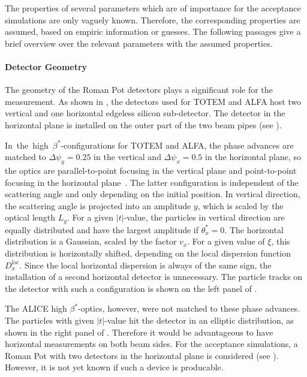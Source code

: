 The properties of several parameters which are of importance for the acceptance simulations are only vaguely known. Therefore, the corresponding properties are assumed, based on empiric information or guesses. The following passages give a brief overview over the relevant parameters with the assumed properties.


\paragraph{Detector Geometry}
The geometry of the Roman Pot detectors plays a significant role for the measurement. As shown in , the detectors used for TOTEM and ALFA host two vertical and one horizontal edgeless silicon sub-detector. The detector in the horizontal plane is installed on the outer part of the two beam pipes (see ). 

\mbox{In the high $\beta^*$-configurations} for TOTEM and ALFA, the phase advances are matched to \mbox{$\Delta \psi_y=0.25$} in the vertical and $\Delta \psi_x=0.5$ in the horizontal plane, so the optics are parallel-to-point focusing in the vertical plane and point-to-point focusing in the horizontal plane~\cite{Hinterberger2008}. The latter configuration is independent of the scattering angle and only depending on the initial position. In vertical direction, the scattering angle is projected into an amplitude $y$, which is scaled by the optical length $L_y$. For a given $|t|$-value, the particles in vertical direction are equally distributed and have the largest amplitude if $\theta_x^* = 0$. The horizontal distribution is a Gaussian, scaled by the factor $v_x$. For a given value of $\xi$, this distribution is horizontally shifted, depending on the local dispersion function $D^{\text{loc}}_x$. Since the local horizontal dispersion is always of the same sign, the installation of a second horizontal detector is unnecessary. The particle tracks on the detector with such a configuration is shown on the left panel of . 

The ALICE high $\beta^*$-optics, however, were not matched to these phase advances. The particles with given $|t|$-value hit the detector in an elliptic distribution, as shown in the right panel of . Therefore it would be advantageous to have horizontal measurements on both beam sides. For the acceptance simulations, a Roman Pot with two detectors in the horizontal plane is considered (see ). However, it is not yet known if such a device is producable.
%
